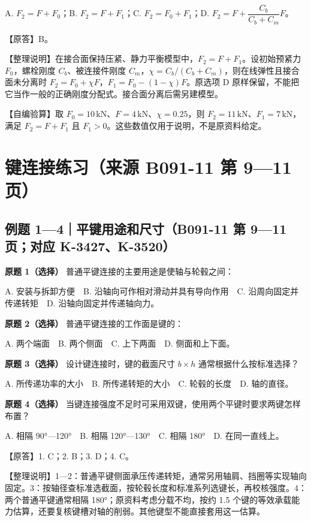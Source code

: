 \documentclass[zihao=5,a4paper,UTF8,fontset=fandol]{ctexart}
\begin{document}
A. $F_2=F+F_0$；B. $F_2=F+F_1$；C. $F_2=F_0+F_1$；D. $F_2=F+\dfrac{C_b}{C_b+C_m}F$。


【原答】B。


【整理说明】在接合面保持压紧、静力平衡模型中，$F_2=F+F_1$。设初始预紧力 $F_0$，螺栓刚度 $C_b$、被连接件刚度 $C_m$，$\chi=C_b/(C_b+C_m)$，则在线弹性且接合面未分离时 $F_2=F_0+\chi F$，$F_1=F_0-(1-\chi)F$。原选项 D 原样保留，不能把它当作一般的正确刚度分配式。接合面分离后需另建模型。


【自编验算】取 $F_0=10\,\mathrm{kN}$、$F=4\,\mathrm{kN}$、$\chi=0.25$，则 $F_2=11\,\mathrm{kN}$、$F_1=7\,\mathrm{kN}$，满足 $F_2=F+F_1$ 且 $F_1>0$。这些数值仅用于说明，不是原资料给定。




\section{键连接练习（来源 B091-11 第 9—11 页）}

\subsection{例题 1—4｜平键用途和尺寸（B091-11 第 9—11 页；对应 K-3427、K-3520）}

\textbf{原题 1（选择）} 普通平键连接的主要用途是使轴与轮毂之间：


A. 安装与拆卸方便　B. 沿轴向可作相对滑动并具有导向作用　C. 沿周向固定并传递转矩　D. 沿轴向固定并传递轴向力。


\textbf{原题 2（选择）} 普通平键连接的工作面是键的：


A. 两个端面　B. 两个侧面　C. 上下两面　D. 侧面和上下面。


\textbf{原题 3（选择）} 设计键连接时，键的截面尺寸 $b\times h$ 通常根据什么按标准选择？


A. 所传递功率的大小　B. 所传递转矩的大小　C. 轮毂的长度　D. 轴的直径。


\textbf{原题 4（选择）} 当键连接强度不足时可采用双键，使用两个平键时要求两键怎样布置？


A. 相隔 90°—120°　B. 相隔 120°—130°　C. 相隔 180°　D. 在同一直线上。


【原答】1. C；2. B；3. D；4. C。


【整理说明】1—2：普通平键侧面承压传递转矩，通常另用轴肩、挡圈等实现轴向固定。3：按轴径查标准选截面，按轮毂长度和标准系列选键长，再校核强度。4：两个普通平键通常相隔 180°；原资料考虑分载不均，按约 1.5 个键的等效承载能力估算，还要复核键槽对轴的削弱。其他键型不能直接套用这一估算。
\end{document}
